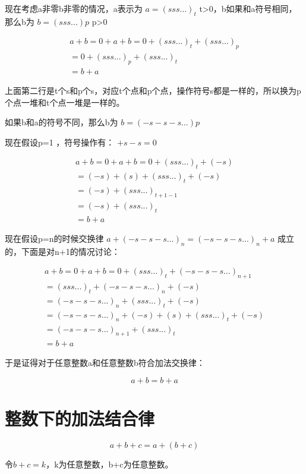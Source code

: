 \documentclass[12pt,oneside]{book}
\begin{document}
现在考虑a非零b非零的情况，a表示为 $a=(sss...)_t$ t>0，b如果和a符号相同，那么b为 $b=(sss...)p$ p>0 


\begin{align*}
a + b = 0 + a +b = 0 + (sss...)_t + (sss...)_p\\
=0+(sss...)_p + (sss...)_t\\
=b+a
\end{align*}

上面第二行是t个s和p个s，对应t个点和p个点，操作符号s都是一样的，所以换为p个点一堆和t个点一堆是一样的。

如果b和a的符号不同，那么b为 $b=(-s-s-s...)p$ 

现在假设p=1 ，符号操作有： $+s-s=0$ 

\begin{align*}
a + b = 0 + a +b = 0 + (sss...)_t + (-s)\\
=(-s) + (s) + (sss...)_{t} + (-s)\\
= (-s) + (sss...)_{t+1-1}\\
= (-s) + (sss...)_t\\
= b+a
\end{align*}

现在假设p=n的时候交换律 $a+(-s-s-s...)_n=(-s-s-s...)_n+a$ 成立的，下面是对n+1的情况讨论：

\begin{align*}
a + b = 0 + a +b = 0 + (sss...)_t + (-s-s-s...)_{n+1}\\
=(sss...)_{t} +(-s-s-s...)_{n} + (-s)\\
= (-s-s-s...)_{n} + (sss...)_{t} + (-s)\\
= (-s-s-s...)_{n} + (-s) + (s) + (sss...)_t + (-s)\\
= (-s-s-s...)_{n+1} + (sss...)_t\\
= b + a
\end{align*}

于是证得对于任意整数a和任意整数b符合加法交换律：

\begin{equation}
a+ b = b+ a
\end{equation}



\section{整数下的加法结合律}
\begin{equation}
a + b + c = a + (b + c)
\end{equation}

令$b+c=k$，k为任意整数，b+c为任意整数。
\end{document}

